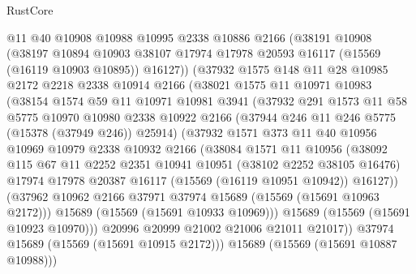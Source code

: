 \begin{lexlean}{RustCore}
\begin{coremodule}
          @11
          @40
          @10908
          @10988
          @10995
          @2338
          @10886
          @2166
          (@38191
            @10908
            (@38197
              @10894
              @10903
              @38107
              @17974
              @17978
              @20593
              @16117
              (@15569 (@16119 @10903 @10895))
              @16127))
          (@37932
            @1575
            @148
            @11
            @28
            @10985
            @2172
            @2218
            @2338
            @10914
            @2166
            (@38021
              @1575
              @11
              @10971
              @10983
              (@38154
                @1574
                @59
                @11
                @10971
                @10981
                @3941
                (@37932
                  @291
                  @1573
                  @11
                  @58
                  @5775
                  @10970
                  @10980
                  @2338
                  @10922
                  @2166
                  (@37944 @246 @11 @246 @5775 (@15378 (@37949 @246)) @25914)
                  (@37932
                    @1571
                    @373
                    @11
                    @40
                    @10956
                    @10969
                    @10979
                    @2338
                    @10932
                    @2166
                    (@38084
                      @1571
                      @11
                      @10956
                      (@38092
                        @115
                        @67
                        @11
                        @2252
                        @2351
                        @10941
                        @10951
                        (@38102 @2252 @38105 @16476)
                        @17974
                        @17978
                        @20387
                        @16117
                        (@15569 (@16119 @10951 @10942))
                        @16127))
                    (@37962 @10962 @2166 @37971 @37974 @15689 (@15569 (@15691 @10963 @2172)))
                    @15689
                    (@15569 (@15691 @10933 @10969)))
                  @15689
                  (@15569 (@15691 @10923 @10970)))
                @20996
                @20999
                @21002
                @21006
                @21011
                @21017))
            @37974
            @15689
            (@15569 (@15691 @10915 @2172)))
          @15689
          (@15569 (@15691 @10887 @10988)))

\end{coremodule}
\end{lexlean}
